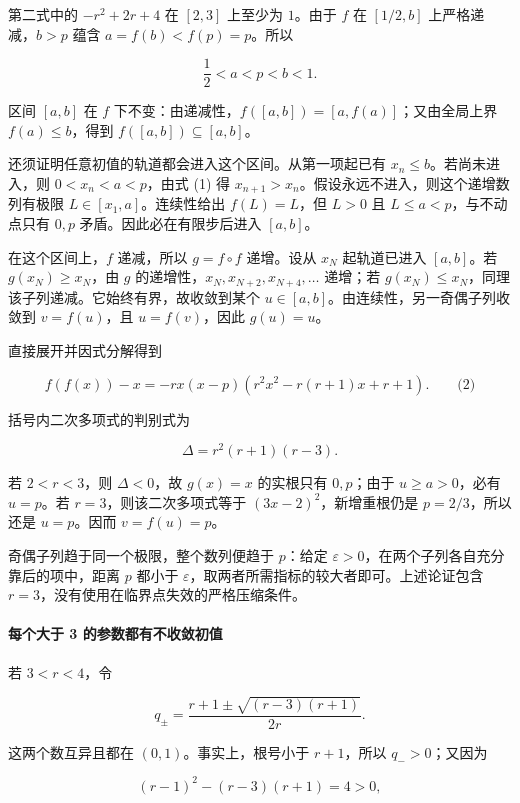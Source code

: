 \documentclass[11pt,a4paper]{article}
\begin{document}
第二式中的 \(-r^2+2r+4\) 在 \([2,3]\) 上至少为 \(1\)。由于 \(f\) 在
\([1/2,b]\) 上严格递减，\(b>p\) 蕴含 \(a=f(b)<f(p)=p\)。所以

\[
\frac12<a<p<b<1.
\]

区间 \([a,b]\) 在 \(f\)
下不变：由递减性，\(f([a,b])=[a,f(a)]\)；又由全局上界
\(f(a)\le b\)，得到 \(f([a,b])\subseteq[a,b]\)。

还须证明任意初值的轨道都会进入这个区间。从第一项起已有
\(x_n\le b\)。若尚未进入，则 \(0<x_n<a<p\)，由式 (1) 得
\(x_{n+1}>x_n\)。假设永远不进入，则这个递增数列有极限
\(L\in[x_1,a]\)。连续性给出 \(f(L)=L\)，但 \(L>0\) 且
\(L\le a<p\)，与不动点只有 \(0,p\) 矛盾。因此必在有限步后进入
\([a,b]\)。

在这个区间上，\(f\) 递减，所以 \(g=f\circ f\) 递增。设从 \(x_N\)
起轨道已进入 \([a,b]\)。若 \(g(x_N)\ge x_N\)，由 \(g\)
的递增性，\(x_N,x_{N+2},x_{N+4},\ldots\) 递增；若
\(g(x_N)\le x_N\)，同理该子列递减。它始终有界，故收敛到某个
\(u\in[a,b]\)。由连续性，另一奇偶子列收敛到 \(v=f(u)\)，且
\(u=f(v)\)，因此 \(g(u)=u\)。

直接展开并因式分解得到

\[
f(f(x))-x
=-rx(x-p)\left(r^2x^2-r(r+1)x+r+1\right).
\qquad\text{(2)}
\]

括号内二次多项式的判别式为

\[
\Delta=r^2(r+1)(r-3).
\]

若 \(2<r<3\)，则 \(\Delta<0\)，故 \(g(x)=x\) 的实根只有 \(0,p\)；由于
\(u\ge a>0\)，必有 \(u=p\)。若 \(r=3\)，则该二次多项式等于
\((3x-2)^2\)，新增重根仍是 \(p=2/3\)，所以还是 \(u=p\)。因而
\(v=f(u)=p\)。

奇偶子列趋于同一个极限，整个数列便趋于 \(p\)：给定
\(\varepsilon>0\)，在两个子列各自充分靠后的项中，距离 \(p\) 都小于
\(\varepsilon\)，取两者所需指标的较大者即可。上述论证包含
\(r=3\)，没有使用在临界点失效的严格压缩条件。

\paragraph{每个大于 3
的参数都有不收敛初值}\label{ux6bcfux4e2aux5927ux4e8e-3-ux7684ux53c2ux6570ux90fdux6709ux4e0dux6536ux655bux521dux503c}

若 \(3<r<4\)，令

\[
q_\pm=\frac{r+1\pm\sqrt{(r-3)(r+1)}}{2r}.
\]

这两个数互异且都在 \((0,1)\)。事实上，根号小于 \(r+1\)，所以
\(q_->0\)；又因为

\[
(r-1)^2-(r-3)(r+1)=4>0,
\]
\end{document}
